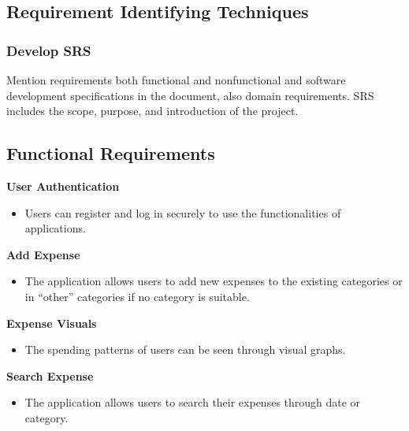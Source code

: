 \documentclass[12pt]{article}
\begin{document}
\noindent
\subsection{Requirement Identifying Techniques}

\vspace{1 cm} %
\noindent
\subsubsection{Develop SRS}
\vspace{0.5 cm}

\noindent
\normalsize Mention requirements both functional and nonfunctional and software development specifications in the document, also domain requirements. SRS includes the scope, purpose, and introduction of the project.
\vspace{1 cm} %

\noindent
\subsection{Functional Requirements}

\vspace{0.5cm} %
\noindent
\normalsize

\textbf{User Authentication}
\begin{itemize}
    \item Users can register and log in securely to use the functionalities of applications.
\end{itemize}

\textbf{Add Expense}
\begin{itemize}
    \item The application allows users to add new expenses to the existing categories or in “other” categories if no category is suitable.
\end{itemize}

\textbf{Expense Visuals}
\begin{itemize}
    \item The spending patterns of users can be seen through visual graphs.
\end{itemize}

\textbf{Search Expense}
\begin{itemize}
    \item The application allows users to search their expenses through date or category.
\end{itemize}
\end{document}
